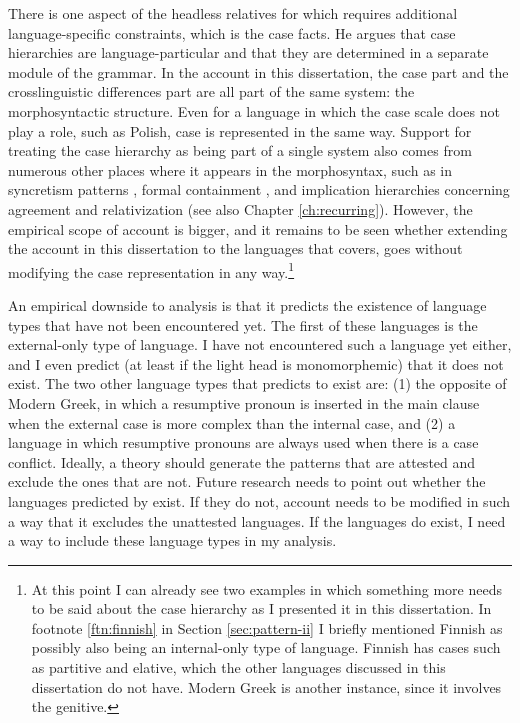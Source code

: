 There is one aspect of the headless relatives for which \citet{vogel2002} requires additional language-specific constraints, which is the case facts.
He argues that case hierarchies are language-particular and that they are determined in a separate module of the grammar. In the account in this dissertation, the case part and the crosslinguistic differences part are all part of the same system: the morphosyntactic structure.
Even for a language in which the case scale does not play a role, such as Polish, case is represented in the same way. 
Support for treating the case hierarchy as being part of a single system also comes from numerous other places where it appears in the morphosyntax, such as in syncretism patterns \citep{baerman2005,caha2009,zompi2017}, formal containment \citep[cf.][]{smith2019,zompi2017,caha2010}, and implication hierarchies concerning agreement \citep{moravcsik1978,bobaljik2006} and relativization \citep{keenan1977,caha2009} (see also Chapter \ref{ch:recurring}).
However, the empirical scope of  account is bigger, and it remains to be seen whether extending the account in this dissertation to the languages that \citet{vogel2002} covers, goes without modifying the case representation in any way.\footnote{
At this point I can already see two examples in which something more needs to be said about the case hierarchy as I presented it in this dissertation. In footnote \ref{ftn:finnish} in Section \ref{sec:pattern-ii} I briefly mentioned Finnish as possibly also being an internal-only type of language. Finnish has cases such as partitive and elative, which the other languages discussed in this dissertation do not have. Modern Greek is another instance, since it involves the genitive.
}

An empirical downside to  analysis is that it predicts the existence of language types that have not been encountered yet. The first of these languages is the external-only type of language. I have not encountered such a language yet either, and I even predict (at least if the light head is monomorphemic) that it does not exist. The two other language types that \citet{vogel2002} predicts to exist are: (1) the opposite of Modern Greek, in which a resumptive pronoun is inserted in the main clause when the external case is more complex than the internal case, and (2) a language in which resumptive pronouns are always used when there is a case conflict. Ideally, a theory should generate the patterns that are attested and exclude the ones that are not.
Future research needs to point out whether the languages predicted by \citet{vogel2002} exist. If they do not,  account needs to be modified in such a way that it excludes the unattested languages. If the languages do exist, I need a way to include these language types in my analysis.

